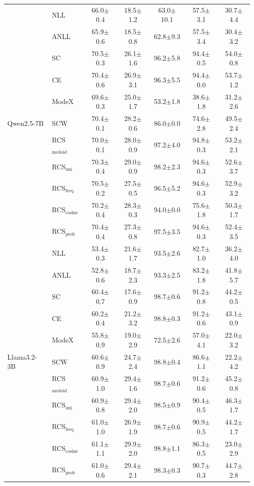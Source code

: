 \begin{table}[t]
{\begin{tabular}{ll|ccccc}
    \multirow{11}{*}{Qwen2.5-7B}
    & NLL & 66.0$\pm$0.4	&18.5$\pm$1.2&	63.0$\pm$10.1	&57.5$\pm$3.1&	30.7$\pm$4.4\\
    & ANLL & 65.9$\pm$0.6&	18.5$\pm$0.8	&62.8$\pm$9.3	&57.5$\pm$3.4&	30.4$\pm$3.2\\
    & SC  & 70.5$\pm$0.3	&26.1$\pm$1.6&	96.2$\pm$5.8	&94.4$\pm$0.5&	54.0$\pm$0.8\\
    & CE    & 70.4$\pm$0.6&	26.9$\pm$3.1	&96.3$\pm$5.5	&94.4$\pm$0.0&	53.7$\pm$1.2\\
    & ModeX & 69.6$\pm$0.3 & 25.0$\pm$1.7 & 53.2$\pm$1.8 & 38.6$\pm$1.8 & 31.2$\pm$2.6\\
    & SCW & 70.4$\pm$0.1 & 28.2$\pm$0.6 & 86.0$\pm$0.0 & 74.6$\pm$2.8 & 49.5$\pm$2.4\\
    & RCS$_\text{medoid}$  &70.0$\pm$0.1	&28.0$\pm$0.9	&97.2$\pm$4.0&	94.8$\pm$0.3&	53.2$\pm$2.1\\
    & RCS$_\text{uni}$&70.3$\pm$0.4	&29.0$\pm$0.9&	98.2$\pm$2.3&	94.6$\pm$0.3	&52.6$\pm$3.7\\
    &  RCS$_\text{freq}$&70.5$\pm$0.2	&27.5$\pm$0.5&	96.5$\pm$5.2	&94.6$\pm$0.3&	52.9$\pm$3.2\\
    & RCS$_\text{cosine}$ & 70.2$\pm$0.4 & 28.3$\pm$0.3 & 94.0$\pm$0.0 & 75.6$\pm$1.8 & 50.3$\pm$1.7\\
    &  RCS$_\text{prob}$  &70.4$\pm$0.4	&27.3$\pm$0.8&	97.5$\pm$3.5	&94.6$\pm$0.3&	52.4$\pm$3.5\\
    \midrule

    \multirow{11}{*}{Llama3.2-3B}
    & NLL & 53.4$\pm$0.3&	21.6$\pm$1.7	&93.5$\pm$2.6&	82.7$\pm$1.0&	36.2$\pm$4.0\\
    & ANLL & 52.8$\pm$0.6	&18.7$\pm$2.3&	93.3$\pm$2.5&	83.2$\pm$1.8&	41.8$\pm$5.7\\
    & SC  & 60.4$\pm$0.7	&17.6$\pm$0.9&	98.7$\pm$0.6&	91.2$\pm$0.8&	44.2$\pm$0.5\\
    & CE    & 60.2$\pm$0.4&	21.2$\pm$3.2	&98.8$\pm$0.3&	91.2$\pm$0.6&	43.1$\pm$0.9\\
    & ModeX    & 55.8$\pm$0.9	&19.0$\pm$2.9&	72.5$\pm$2.6	&57.0$\pm$4.1	&22.0$\pm$3.2\\
    & SCW & 60.6$\pm$0.9 & 24.7$\pm$2.4 & 98.8$\pm$0.4 & 86.6$\pm$1.1 & 22.2$\pm$4.2\\
    & RCS$_\text{medoid}$  &60.9$\pm$1.0	&29.4$\pm$1.6&	98.7$\pm$0.6&	91.2$\pm$0.6&	45.2$\pm$0.8\\
    & RCS$_\text{uni}$&	60.9$\pm$0.8	&29.4$\pm$2.0	&98.5$\pm$0.9	&90.4$\pm$0.5&	46.3$\pm$1.7\\
    &  RCS$_\text{freq}$&61.0$\pm$1.0&	26.9$\pm$1.9&	98.7$\pm$0.6&	90.9$\pm$0.5	&44.2$\pm$1.7\\
    & RCS$_\text{cosine}$ & 61.1$\pm$1.1 & 29.9$\pm$2.0 & 98.8$\pm$1.1 & 86.3$\pm$0.5 & 23.0$\pm$2.9\\
    &  RCS$_\text{prob}$  &61.0$\pm$0.6	&29.4$\pm$2.1	&98.3$\pm$0.3&	90.7$\pm$0.3&	44.7$\pm$2.8\\
    \midrule


\end{tabular}}
\end{table}
